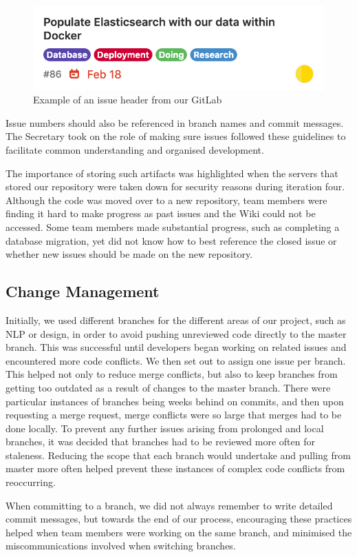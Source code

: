 \documentclass{l3proj}
\begin{document}
\begin{figure}[h!]
    \centering
    \includegraphics[width=0.4\linewidth]{figures/Project_Planning.png}
    \caption{Example of an issue header from our GitLab}
\end{figure}

Issue numbers should also be referenced in branch names and commit messages. The Secretary took on the role of making sure issues followed these guidelines to facilitate common understanding and organised development.

The importance of storing such artifacts was highlighted when the servers that stored our repository were taken down for security reasons during iteration four. Although the code was moved over to a new repository, team members were finding it hard to make progress as past issues and the Wiki could not be accessed. Some team members made substantial progress, such as completing a database migration, yet did not know how to best reference the closed issue or whether new issues should be made on the new repository.

\subsection{Change Management}
\label{subsec:change_mgmt}

Initially, we used different branches for the different areas of our project, such as NLP or design, in order to avoid pushing unreviewed code directly to the master branch. This was successful until developers began working on related issues and encountered more code conflicts. We then set out to assign one issue per branch. This helped not only to reduce merge conflicts, but also to keep branches from getting too outdated as a result of changes to the master branch. There were particular instances of branches being weeks behind on commits, and then upon requesting a merge request, merge conflicts were so large that merges had to be done locally. To prevent any further issues arising from prolonged and local branches, it was decided that branches had to be reviewed more often for staleness. Reducing the scope that each branch would undertake and pulling from master more often helped prevent these instances of complex code conflicts from reoccurring.

When committing to a branch, we did not always remember to write detailed commit messages, but towards the end of our process, encouraging these practices helped when team members were working on the same branch, and minimised the miscommunications involved when switching branches.
\end{document}

